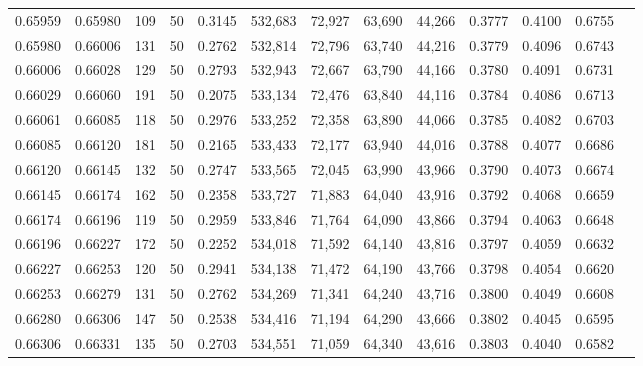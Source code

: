 \begin{tabular}{rrrrrrrrrrrrr}
0.65959 & 0.65980 &   109 &  50 &                                     0.3145 & 532,683 &  72,927 &  63,690 &  44,266 & 0.3777 & 0.4100 & 0.6755 \\
0.65980 & 0.66006 &   131 &  50 &                                     0.2762 & 532,814 &  72,796 &  63,740 &  44,216 & 0.3779 & 0.4096 & 0.6743 \\
0.66006 & 0.66028 &   129 &  50 &                                     0.2793 & 532,943 &  72,667 &  63,790 &  44,166 & 0.3780 & 0.4091 & 0.6731 \\
0.66029 & 0.66060 &   191 &  50 &                                     0.2075 & 533,134 &  72,476 &  63,840 &  44,116 & 0.3784 & 0.4086 & 0.6713 \\
0.66061 & 0.66085 &   118 &  50 &                                     0.2976 & 533,252 &  72,358 &  63,890 &  44,066 & 0.3785 & 0.4082 & 0.6703 \\
0.66085 & 0.66120 &   181 &  50 &                                     0.2165 & 533,433 &  72,177 &  63,940 &  44,016 & 0.3788 & 0.4077 & 0.6686 \\
0.66120 & 0.66145 &   132 &  50 &                                     0.2747 & 533,565 &  72,045 &  63,990 &  43,966 & 0.3790 & 0.4073 & 0.6674 \\
0.66145 & 0.66174 &   162 &  50 &                                     0.2358 & 533,727 &  71,883 &  64,040 &  43,916 & 0.3792 & 0.4068 & 0.6659 \\
0.66174 & 0.66196 &   119 &  50 &                                     0.2959 & 533,846 &  71,764 &  64,090 &  43,866 & 0.3794 & 0.4063 & 0.6648 \\
0.66196 & 0.66227 &   172 &  50 &                                     0.2252 & 534,018 &  71,592 &  64,140 &  43,816 & 0.3797 & 0.4059 & 0.6632 \\
0.66227 & 0.66253 &   120 &  50 &                                     0.2941 & 534,138 &  71,472 &  64,190 &  43,766 & 0.3798 & 0.4054 & 0.6620 \\
0.66253 & 0.66279 &   131 &  50 &                                     0.2762 & 534,269 &  71,341 &  64,240 &  43,716 & 0.3800 & 0.4049 & 0.6608 \\
0.66280 & 0.66306 &   147 &  50 &                                     0.2538 & 534,416 &  71,194 &  64,290 &  43,666 & 0.3802 & 0.4045 & 0.6595 \\
0.66306 & 0.66331 &   135 &  50 &                                     0.2703 & 534,551 &  71,059 &  64,340 &  43,616 & 0.3803 & 0.4040 & 0.6582 \\

\end{tabular}
